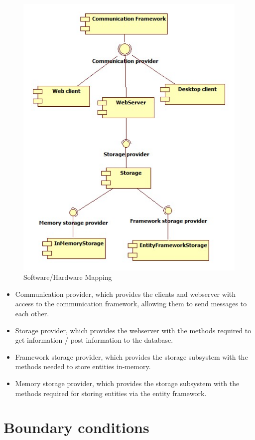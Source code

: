 \begin{figure}[H]
\includegraphics[scale=0.8]{img/SubsystemServices.jpg}
\caption{Software/Hardware Mapping}
\label{fig:Subsystem Services}
\end{figure}


\begin{itemize}
	\item Communication provider, which provides the clients and webserver with access to the communication framework, allowing them to send messages to each other.
	\item Storage provider, which provides the webserver with the methods required to get information / post information to the database.
	\item Framework storage provider, which provides the storage subsystem with the methods needed to store entities in-memory.
	\item Memory storage provider, which provides the storage subsystem with the methods required for storing entities via the entity framework.
\end{itemize}

\section{Boundary conditions}

